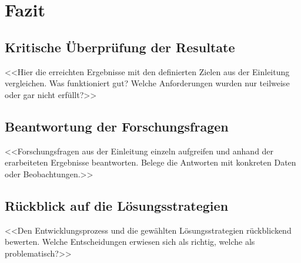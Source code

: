 
\chapter{Fazit}
\label{chap:fazit}

\section{Kritische Überprüfung der Resultate}

<<Hier die erreichten Ergebnisse mit den definierten Zielen aus der Einleitung
vergleichen. Was funktioniert gut? Welche Anforderungen wurden nur teilweise
oder gar nicht erfüllt?>>

\section{Beantwortung der Forschungsfragen}

<<Forschungsfragen aus der Einleitung einzeln aufgreifen und anhand der
erarbeiteten Ergebnisse beantworten. Belege die Antworten mit konkreten
Daten oder Beobachtungen.>>

\section{Rückblick auf die Lösungsstrategien}

<<Den Entwicklungsprozess und die gewählten Lösungsstrategien rückblickend
bewerten. Welche Entscheidungen erwiesen sich als richtig, welche als
problematisch?>>

